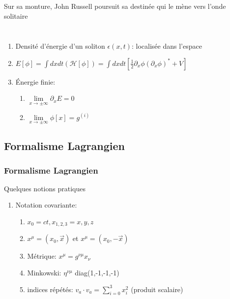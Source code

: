 \documentclass[handout]{beamer}
\begin{document}
\begin{frame}
Sur sa monture, John Russell poursuit sa destinée qui le mène vers l'onde solitaire
\begin{columns}
    \begin{column}{.5\linewidth}
   \begin{figure}[0.3\textwidth]
    \end{figure}
    \end{column}
    \begin{column}{.5\linewidth}
    \begin{figure}[0.3\textwidth]
    \end{figure}
    \end{column}
  \end{columns}
\end{frame}


\begin{frame}
	\begin{enumerate}
	\item Densité d'énergie d'un soliton $\epsilon(x,t)$: localisée dans l'espace
	\item $E[\phi] = \int{dxdt (\mathcal{H}[\phi])} = \int{dxdt [\frac{1}{2} \partial_x \phi (\partial_x \phi)^* +V]}$
	\item Énergie finie:
	\begin{enumerate}
	\item  $\lim\limits_{x \to \pm\infty}\partial_x E =0$
	\item  $\lim\limits_{x \to \pm\infty} \phi[x] = g^{(i)}$	
	\end{enumerate}	
	\end{enumerate} 
\end{frame}


\subsection{Formalisme Lagrangien}
\begin{frame}

\frametitle{Formalisme Lagrangien}

\begin{block}{Quelques notions pratiques}
\begin{enumerate}

\item Notation covariante:
\begin{enumerate}
\item $x_0 = ct, x_{1,2,3} = x,y,z$
\item $x^\mu = (x_0,\vec{x})$ et $x^\mu = (x_0,-\vec{x})$
\item Métrique: $x^\mu = g^{\nu\mu} x_\nu$
\item Minkowski: $\eta^{\nu\mu}$ diag(1,-1,-1,-1)
\item indices répétés: $v_a \cdot v_a = \sum_{i=0}^{3}x_i^2$ (produit scalaire)
\end{enumerate}

\end{enumerate}
\end{block}
\end{frame}
\end{document}

